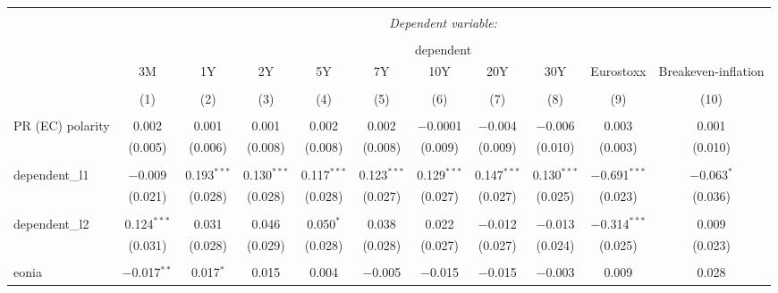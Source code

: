 


\begin{table}[!htbp] \centering 
  \caption{} 
  \label{} 
  \begin{adjustbox}{width=1.35\textwidth}
\begin{tabular}{@{\extracolsep{5pt}}lcccccccccc} 
\\[-1.8ex]\hline 
\hline \\[-1.8ex] 
 & \multicolumn{10}{c}{\textit{Dependent variable:}} \\ 
\cline{2-11} 
\\[-1.8ex] & \multicolumn{10}{c}{dependent} \\ 
 & 3M & 1Y & 2Y & 5Y & 7Y & 10Y & 20Y & 30Y & Eurostoxx & Breakeven-inflation \\ 
\\[-1.8ex] & (1) & (2) & (3) & (4) & (5) & (6) & (7) & (8) & (9) & (10)\\ 
\hline \\[-1.8ex] 
 PR (EC) polarity & 0.002 & 0.001 & 0.001 & 0.002 & 0.002 & $-$0.0001 & $-$0.004 & $-$0.006 & 0.003 & 0.001 \\ 
  & (0.005) & (0.006) & (0.008) & (0.008) & (0.008) & (0.009) & (0.009) & (0.010) & (0.003) & (0.010) \\ 
  & & & & & & & & & & \\ 
 dependent\_l1 & $-$0.009 & 0.193$^{***}$ & 0.130$^{***}$ & 0.117$^{***}$ & 0.123$^{***}$ & 0.129$^{***}$ & 0.147$^{***}$ & 0.130$^{***}$ & $-$0.691$^{***}$ & $-$0.063$^{*}$ \\ 
  & (0.021) & (0.028) & (0.028) & (0.028) & (0.027) & (0.027) & (0.027) & (0.025) & (0.023) & (0.036) \\ 
  & & & & & & & & & & \\ 
 dependent\_l2 & 0.124$^{***}$ & 0.031 & 0.046 & 0.050$^{*}$ & 0.038 & 0.022 & $-$0.012 & $-$0.013 & $-$0.314$^{***}$ & 0.009 \\ 
  & (0.031) & (0.028) & (0.029) & (0.028) & (0.028) & (0.027) & (0.027) & (0.024) & (0.025) & (0.023) \\ 
  & & & & & & & & & & \\ 
 eonia & $-$0.017$^{**}$ & 0.017$^{*}$ & 0.015 & 0.004 & $-$0.005 & $-$0.015 & $-$0.015 & $-$0.003 & 0.009 & 0.028 \\ 

\end{tabular}
\end{adjustbox}
\end{table}
